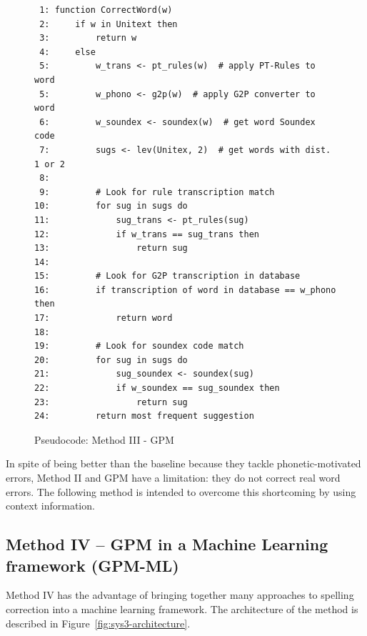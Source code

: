 \begin{figure}
\scriptsize
\caption{Pseudocode: Method III - GPM}\label{fig:pseudocode-method3}
\begin{lstlisting}
 1: function CorrectWord(w)
 2:     if w in Unitext then
 3:         return w
 4:     else
 5:         w_trans <- pt_rules(w)  # apply PT-Rules to word
 5:         w_phono <- g2p(w)  # apply G2P converter to word
 6:         w_soundex <- soundex(w)  # get word Soundex code
 7:         sugs <- lev(Unitex, 2)  # get words with dist. 1 or 2
 8:         
 9:         # Look for rule transcription match
10:         for sug in sugs do
11:             sug_trans <- pt_rules(sug)
12:             if w_trans == sug_trans then
13:                 return sug
14:   
15:         # Look for G2P transcription in database
16:         if transcription of word in database == w_phono then
17:             return word
18:
19:         # Look for soundex code match
20:         for sug in sugs do
21:             sug_soundex <- soundex(sug)
22:             if w_soundex == sug_soundex then
23:                 return sug
24:         return most frequent suggestion
\end{lstlisting}
\end{figure}

In spite of being better than the baseline because they tackle phonetic-motivated errors, Method II and GPM have a limitation: they do not correct real word errors. The following method is intended to overcome this shortcoming by using context information.


\subsection{Method IV -- GPM in a Machine Learning framework (GPM-ML)}

Method IV has the advantage of bringing together many approaches to spelling correction into a machine learning framework. The architecture of the method is described in Figure~\ref{fig:sys3-architecture}. 


